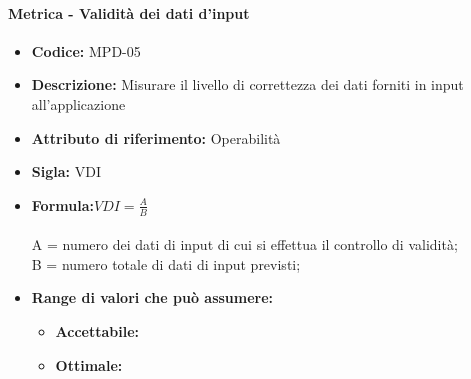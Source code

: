 	 \paragraph{Metrica - Validità dei dati d'input} 
	    \begin{itemize}
          \item  \textbf{Codice: } MPD-05
           \item \textbf{Descrizione:} Misurare il livello di correttezza dei dati forniti in input all'applicazione
         \item   \textbf{Attributo di riferimento:} Operabilità
          \item  \textbf{Sigla:} VDI
         \item   \textbf{Formula:}\begin{math} VDI = \frac{A}{B}\end{math}\\ \\
             A = numero dei dati di input di cui si effettua il controllo di validità;\\
             B = numero totale di dati di input previsti;
                   \item \textbf{Range di valori che può assumere:}
        \begin{itemize}
            \item \textbf{Accettabile:} 
            \item \textbf{Ottimale:} 
        \end{itemize}
       \end{itemize}
              
             
